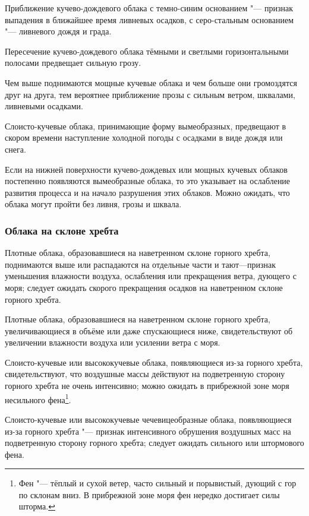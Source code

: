  Приближение кучево-дождевого облака с темно-синим основанием "---
признак выпадения в ближайшее время ливневых осадков, с серо-стальным
основанием "--- ливневого дождя и града.

 Пересечение кучево-дождевого облака тёмными и светлыми
горизонтальными полосами предвещает сильную грозу.

 Чем выше поднимаются мощные кучевые облака и чем больше они
громоздятся друг на друга, тем вероятнее приближение прозы с сильным
ветром, шквалами, ливневыми осадками.

 Слоисто-кучевые облака, принимающие форму вымеобразных,
предвещают в скором времени наступление холодной погоды с осадками в
виде дождя или снега.

 Если на нижней поверхности кучево-дождевых или мощных кучевых
облаков постепенно появляются вымеобразные облака, то это указывает на
ослабление развития процесса и на начало разрушения этих
облаков. Можно ожидать, что облака могут пройти без ливня, грозы и
шквала.

\subsubsection{Облака на склоне хребта}

 Плотные облака, образовавшиеся на наветренном склоне горного
хребта, поднимаются выше или распадаются на отдельные части и
тают—признак уменьшения влажности воздуха, ослабления или прекращения
ветра, дующего с моря; следует ожидать скорого прекращения осадков на
наветренном склоне горного хребта.

 Плотные облака, образовавшиеся на наветренном склоне горного
хребта, увеличивающиеся в объёме или даже спускающиеся ниже,
свидетельствуют об увеличении влажности воздуха или усилении ветра с
моря.

 Слоисто-кучевые или высококучевые облака, появляющиеся из-за
горного хребта, свидетельствуют, что воздушные массы действуют на
подветренную сторону горного хребта не очень интенсивно; можно ожидать
в прибрежной зоне моря несильного фена\footnote{Фен "--- тёплый и
  сухой ветер, часто сильный и порывистый, дующий с гор по склонам
  вниз. В прибрежной зоне моря фен нередко достигает силы шторма.}.

 Слоисто-кучевые или высококучевые чечевицеобразные облака,
появляющиеся из-за горного хребта "--- признак интенсивного обрушения
воздушных масс на подветренную сторону горного хребта; следует ожидать
сильного или штормового фена.


